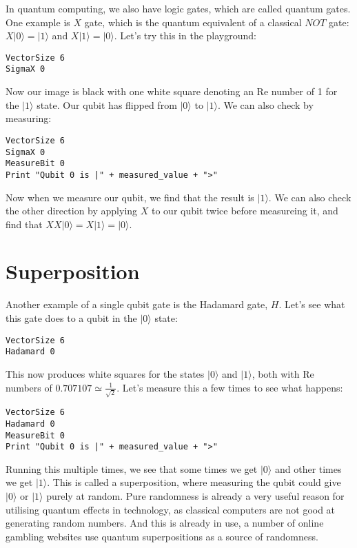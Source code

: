 \documentclass[twocolumn]{article}
\begin{document}
In quantum computing, we also have logic gates, which are called quantum gates. One example is $X$ gate, which is the quantum equivalent of a classical $NOT$ gate: $X|0\rangle = |1\rangle$ and $X|1\rangle = |0\rangle$. Let's try this in the playground:

\begin{lstlisting}
VectorSize 6
SigmaX 0
\end{lstlisting}

Now our image is black with one white square denoting an Re number of 1 for the $|1\rangle$ state. Our qubit has flipped from $|0\rangle$ to $|1\rangle$. We can also check by measuring:

\begin{lstlisting}
VectorSize 6
SigmaX 0
MeasureBit 0
Print "Qubit 0 is |" + measured_value + ">"
\end{lstlisting}

Now when we measure our qubit, we find that the result is $|1\rangle$. We can also check the other direction by applying $X$ to our qubit twice before measureing it, and find that $XX|0\rangle = X|1\rangle = |0\rangle$.

\section{Superposition}
\label{sec:superposition}

Another example of a single qubit gate is the Hadamard gate, $H$. Let's see what this gate does to a qubit in the $|0\rangle$ state:

\begin{lstlisting}
VectorSize 6
Hadamard 0
\end{lstlisting}

This now produces white squares for the states $|0\rangle$ and $|1\rangle$, both with Re numbers of $0.707107 \simeq \frac{1}{\sqrt{2}}$. Let's measure this a few times to see what happens:

\begin{lstlisting}
VectorSize 6
Hadamard 0
MeasureBit 0
Print "Qubit 0 is |" + measured_value + ">"
\end{lstlisting}

Running this multiple times, we see that some times we get $|0\rangle$ and other times we get $|1\rangle$. This is called a superposition, where measuring the qubit could give $|0\rangle$ or $|1\rangle$ purely at random. Pure randomness is already a very useful reason for utilising quantum effects in technology, as classical computers are not good at generating random numbers. And this is already in use, a number of online gambling websites use quantum superpositions as a source of randomness.
\end{document}
